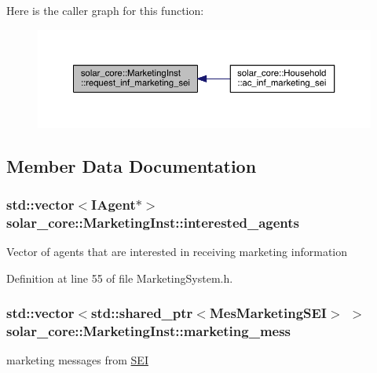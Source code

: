 Here is the caller graph for this function\+:
\nopagebreak
\begin{figure}[H]
\begin{center}
\leavevmode
\includegraphics[width=350pt]{classsolar__core_1_1_marketing_inst_a0eb7c3b990063684a04c7b5f38138cbf_icgraph}
\end{center}
\end{figure}




\subsection{Member Data Documentation}
\hypertarget{classsolar__core_1_1_marketing_inst_a5e0f3d40db44d0779a944ecdad24d447}{}
\subsubsection[{interested\+\_\+agents}]{\setlength{\rightskip}{0pt plus 5cm}std\+::vector$<${\bf I\+Agent}$\ast$$>$ solar\+\_\+core\+::\+Marketing\+Inst\+::interested\+\_\+agents\hspace{0.3cm}{\ttfamily [protected]}}\label{classsolar__core_1_1_marketing_inst_a5e0f3d40db44d0779a944ecdad24d447}
Vector of agents that are interested in receiving marketing information 

Definition at line 55 of file Marketing\+System.\+h.

\hypertarget{classsolar__core_1_1_marketing_inst_af386df7399502fc26c6625600a68edb3}{}
\subsubsection[{marketing\+\_\+mess}]{\setlength{\rightskip}{0pt plus 5cm}std\+::vector$<$std\+::shared\+\_\+ptr$<${\bf Mes\+Marketing\+S\+E\+I}$>$ $>$ solar\+\_\+core\+::\+Marketing\+Inst\+::marketing\+\_\+mess\hspace{0.3cm}{\ttfamily [protected]}}\label{classsolar__core_1_1_marketing_inst_af386df7399502fc26c6625600a68edb3}
marketing messages from \hyperlink{classsolar__core_1_1_s_e_i}{S\+E\+I} 

